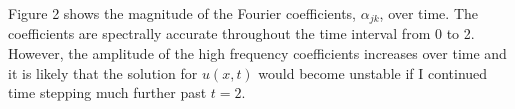 \documentclass[12pt]{article}
\begin{document}
Figure 2 shows the magnitude of the Fourier coefficients,
$\alpha_{jk}$, over time.  The coefficients are spectrally accurate
throughout the time interval from 0 to 2.  However, the amplitude of
the high frequency coefficients increases over time and it is likely
that the solution for $u(x,t)$ would become unstable if I continued
time stepping much further past $t=2$.
\end{document}
